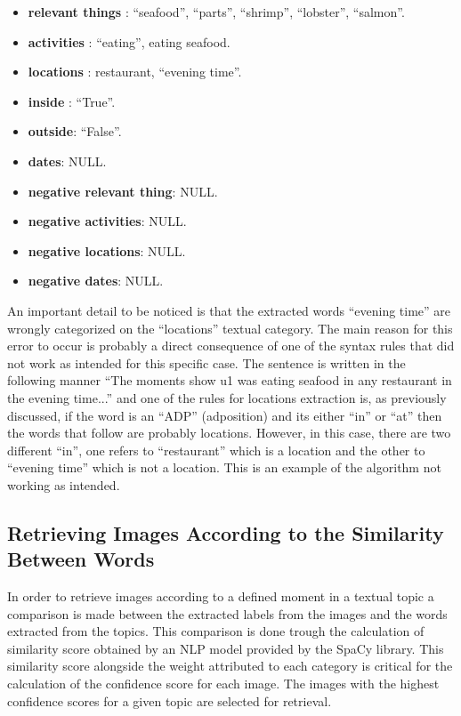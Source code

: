       \begin{itemize}
        \itemsep0em
        \item \textbf{relevant things} : 
        \enquote{seafood},
        \enquote{parts},
        \enquote{shrimp},
        \enquote{lobster},
        \enquote{salmon}.
        \item \textbf{activities} : \enquote{eating},
        {eating seafood}.
        \item \textbf{locations} : {restaurant},  \enquote{evening time}.
        \item \textbf{inside} : \enquote{True}.
        \item \textbf{outside}: \enquote{False}.
        \item \textbf{dates}: NULL.
        \item \textbf{negative relevant thing}: NULL.
        \item \textbf{negative activities}: NULL.
        \item \textbf{negative locations}:  NULL.
        \item \textbf{negative dates}: NULL.
       
    \end{itemize}
\newpage
    An important detail to be noticed is that the extracted words \enquote{evening time} are wrongly categorized on the \enquote{locations} textual category. The main reason for this error to occur is probably a direct consequence of one of the syntax rules that did not work as intended for this specific case. The sentence is written in the following manner \enquote{The moments show u1 was eating seafood in any restaurant in the evening time...} and one of the rules for locations extraction is, as previously discussed, if the word is an \enquote{ADP} (adposition) and its either \enquote{in} or \enquote{at} then the words that follow are probably locations. However, in this case, there are two different \enquote{in}, one refers to \enquote{restaurant} which is a location and the other to \enquote{evening time} which is not a location. This is an example of the algorithm not working as intended.

    \subsection{Retrieving Images According to the Similarity Between Words}

    In order to retrieve images according to a defined moment in a textual topic a comparison is made between the extracted labels from the images and the words extracted from the topics. This comparison is done trough the calculation of similarity score obtained by an NLP model provided by the SpaCy library. This similarity score alongside the weight attributed to each category is critical for the calculation of the confidence score for each image. The images with the highest confidence scores for a given topic are selected for retrieval.
    

